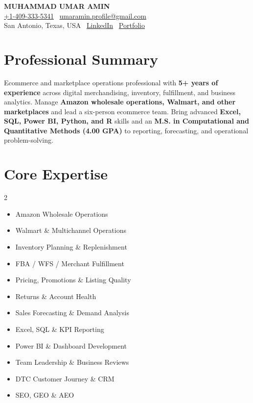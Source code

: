 \documentclass[a4paper,12pt]{article}
\begin{document}
\begin{center}
{\Huge\textbf{MUHAMMAD UMAR AMIN}}\\[-1pt]
\small
\href{tel:+14093335341}{+1-409-333-5341} \textbar\
\href{mailto:umaramin.profile@gmail.com}{umaramin.profile@gmail.com}\\
San Antonio, Texas, USA \textbar\
\href{https://www.linkedin.com/in/muhammad-umar-amin-0a6795257/}{LinkedIn} \textbar\
\href{https://muhammadumaramin.github.io/portfolio/}{Portfolio}
\end{center}
\vspace{-6mm}
\small
\section{\textbf{Professional Summary}}
Ecommerce and marketplace operations professional with \textbf{5+ years of experience} across digital merchandising, inventory, fulfillment, and business analytics. Manage \textbf{Amazon wholesale operations, Walmart, and other marketplaces} and lead a six-person ecommerce team. Bring advanced \textbf{Excel, SQL, Power BI, Python, and R} skills and an \textbf{M.S. in Computational and Quantitative Methods (4.00 GPA)} to reporting, forecasting, and operational problem-solving.
\vspace{-2mm}
\section{\textbf{Core Expertise}}
\begin{multicols}{2}
\begin{itemize}[leftmargin=*,itemsep=0.2mm]
\item Amazon Wholesale Operations
\item Walmart \& Multichannel Operations
\item Inventory Planning \& Replenishment
\item FBA / WFS / Merchant Fulfillment
\item Pricing, Promotions \& Listing Quality
\item Returns \& Account Health
\item Sales Forecasting \& Demand Analysis
\item Excel, SQL \& KPI Reporting
\item Power BI \& Dashboard Development
\item Team Leadership \& Business Reviews
\item DTC Customer Journey \& CRM
\item SEO, GEO \& AEO
\end{itemize}
\end{multicols}
\vspace{-2mm}
\end{document}
